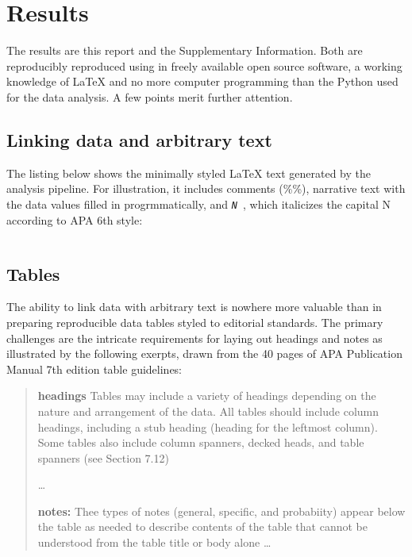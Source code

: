 \documentclass[helv,10pt,man,floatsintext]{apa6}  %
\begin{document}
\section{Results}

The results are this report and the Supplementary Information. Both
are reproducibly reproduced using in freely available open source
software, a working knowledge of \LaTeX{} and no more computer
programming than the Python used for the data analysis.  A few points
merit further attention.

\label{sec:results}

\subsection{Linking data and arbitrary text}




The listing below shows the minimally styled \LaTeX{} text generated
by the analysis pipeline. For illustration, it includes comments
(\%\%), narrative text with the data values filled in progrmmatically,
and \texttt{{\it N }}, which italicizes the capital N
according to APA 6th style:

\inputminted{latex}{generated/arbitrary_text.tex}


\subsection{Tables}

The ability to link data with arbitrary text is nowhere more valuable
than in preparing reproducible data tables styled to editorial
standards.  The primary challenges are the intricate requirements for
laying out headings and notes as illustrated by the following exerpts,
drawn from the 40 pages of APA Publication Manual 7th edition table
guidelines:

\begin{quote}
{\bf headings} Tables may include a variety of headings depending on
the nature and arrangement of the data. All tables should include
column headings, including a stub heading (heading for the leftmost
column). Some tables also include column spanners, decked heads, and
table spanners (see Section 7.12) 

\ldots

{\bf notes:} Thee types of notes (general, specific, and probabiity)
appear below the table as needed to describe contents of the table
that cannot be understood from the table title or body alone \ldots
\end{quote}
\end{document}
